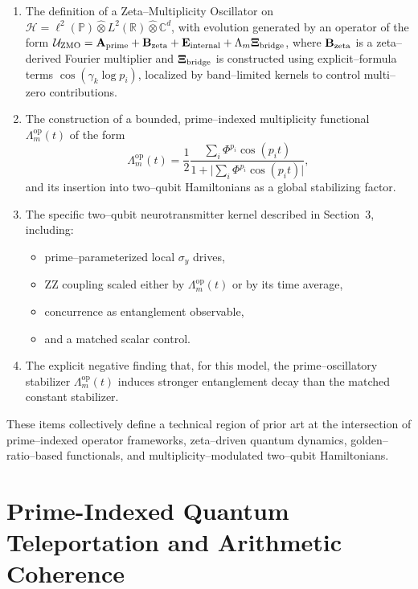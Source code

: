 \documentclass[11pt]{article}
\begin{document}
\begin{enumerate}
  \item The definition of a Zeta–Multiplicity Oscillator on
  \(\mathcal{H} = \ell^2(\mathbb{P}) \widehat{\otimes} L^2(\mathbb{R}) \widehat{\otimes} \mathbb{C}^d\),
  with evolution generated by an operator of the form
  \(\mathcal{U}_{\rm ZMO} = \mathbf{A}_{\rm prime} + \mathbf{B}_{\rm zeta} + \mathbf{E}_{\rm internal} + \Lambda_m \mathbf{\Xi}_{\rm bridge}\),
  where \(\mathbf{B}_{\rm zeta}\) is a zeta–derived Fourier multiplier and \(\mathbf{\Xi}_{\rm bridge}\) is constructed using explicit–formula terms \(\cos(\gamma_k \log p_i)\), localized by band–limited kernels to control multi–zero contributions.\cite{RZQC,KeatingQC,RHOverview}
  \item The construction of a bounded, prime–indexed multiplicity functional
  \(\Lambda_m^{\mathrm{op}}(t)\) of the form
  \[
    \Lambda_m^{\mathrm{op}}(t)
    = \frac{1}{2}\frac{\sum_i \Phi^{p_i}\cos(p_i t)}{1 + \bigl|\sum_i \Phi^{p_i}\cos(p_i t)\bigr|},
  \]
  and its insertion into two–qubit Hamiltonians as a global stabilizing factor.
  \item The specific two–qubit neurotransmitter kernel described in Section~3, including:
  \begin{itemize}
    \item prime–parameterized local \(\sigma_y\) drives,
    \item ZZ coupling scaled either by \(\Lambda_m^{\mathrm{op}}(t)\) or by its time average,
    \item concurrence as entanglement observable,
    \item and a matched scalar control.
  \end{itemize}
  \item The explicit negative finding that, for this model, the prime–oscillatory stabilizer \(\Lambda_m^{\mathrm{op}}(t)\) induces stronger entanglement decay than the matched constant stabilizer.
\end{enumerate}

These items collectively define a technical region of prior art at the intersection of prime–indexed operator frameworks, zeta–driven quantum dynamics, golden–ratio–based functionals, and multiplicity–modulated two–qubit Hamiltonians.

\section{Prime-Indexed Quantum Teleportation and Arithmetic Coherence}
\end{document}
